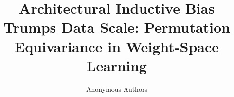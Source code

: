 \documentclass[10pt]{article}
\title{Architectural Inductive Bias Trumps Data Scale: Permutation Equivariance in Weight-Space Learning}
\author{Anonymous Authors}
\date{}
\begin{document}
\maketitle

\begin{abstract}

\end{abstract}











\end{document}
